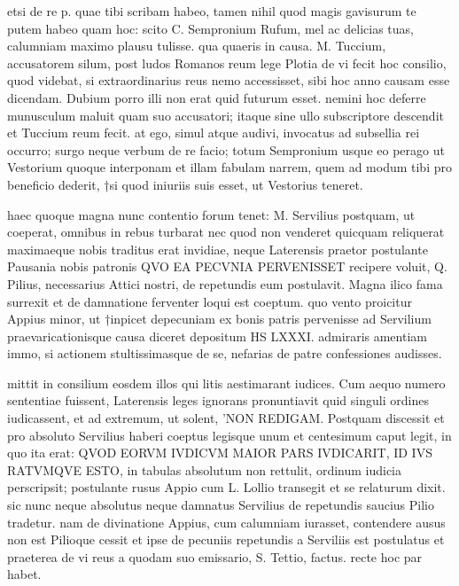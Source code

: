 


 etsi de re p. quae tibi scribam habeo, tamen nihil quod magis gavisurum te putem habeo quam hoc: scito C. Sempronium Rufum, mel ac delicias tuas, calumniam maximo plausu tulisse. qua quaeris in causa. M. Tuccium, accusatorem silum, post ludos Romanos reum lege Plotia de vi fecit hoc consilio, quod videbat, si extraordinarius reus nemo accessisset, sibi hoc anno causam esse dicendam. Dubium porro illi non erat quid futurum esset. nemini hoc deferre munusculum maluit quam suo accusatori; itaque sine ullo subscriptore descendit et Tuccium reum fecit. at ego, simul atque audivi, invocatus ad subsellia rei occurro; surgo neque verbum de re facio; totum Sempronium usque eo perago ut Vestorium quoque interponam et illam fabulam narrem, quem ad modum tibi pro beneficio dederit, †si quod iniuriis suis esset, ut Vestorius teneret.

 haec quoque magna nunc contentio forum tenet: M. Servilius postquam, ut coeperat, omnibus in rebus turbarat nec quod non venderet quicquam reliquerat maximaeque nobis traditus erat invidiae, neque Laterensis praetor postulante Pausania nobis patronis QVO EA PECVNIA PERVENISSET recipere voluit, Q. Pilius, necessarius Attici nostri, de repetundis eum postulavit. Magna ilico fama surrexit et de damnatione ferventer loqui est coeptum. quo vento proicitur Appius minor, ut †inpicet depecuniam ex bonis patris pervenisse ad Servilium praevaricationisque causa diceret depositum HS LXXXI. admiraris amentiam immo, si actionem stultissimasque de se, nefarias de patre confessiones audisses.

 mittit in consilium eosdem illos qui litis aestimarant iudices. Cum aequo numero sententiae fuissent, Laterensis leges ignorans pronuntiavit quid singuli ordines iudicassent, et ad extremum, ut solent, 'NON REDIGAM. Postquam discessit et pro absoluto Servilius haberi coeptus legisque unum et centesimum caput legit, in quo ita erat: QVOD EORVM IVDICVM MAIOR PARS IVDICARIT, ID IVS RATVMQVE ESTO, in tabulas absolutum non rettulit, ordinum iudicia perscripsit; postulante rusus Appio cum L. Lollio transegit et se relaturum dixit. sic nunc neque absolutus neque damnatus Servilius de repetundis saucius Pilio tradetur. nam de divinatione Appius, cum calumniam iurasset, contendere ausus non est Pilioque cessit et ipse de pecuniis repetundis a Serviliis est postulatus et praeterea de vi reus a quodam suo emissario, S. Tettio, factus. recte hoc par habet.

